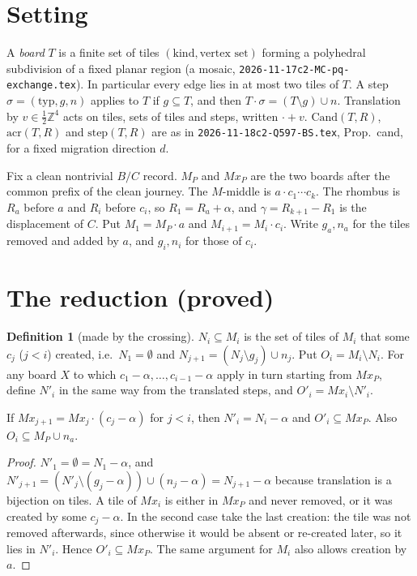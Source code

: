 \documentclass[11pt]{article}
\theoremstyle{definition}\newtheorem{definition}[theorem]{Definition}\newtheorem{remark}[theorem]{Remark}
\begin{document}
\section{Setting}\label{sec:set}
A \emph{board} $T$ is a finite set of tiles $(\mathrm{kind},\text{vertex set})$ forming a polyhedral subdivision of a fixed planar region (a mosaic, \texttt{2026-11-17c2-MC-pq-exchange.tex}). In particular every edge lies in at most two tiles of $T$.
A step $\sigma=(\mathrm{typ},g,n)$ applies to $T$ if $g\subseteq T$, and then $T\cdot\sigma=(T\setminus g)\cup n$. Translation by $v\in\tfrac12\mathbb Z^4$ acts on tiles, sets of tiles and steps, written $\cdot+v$.
$\mathrm{Cand}(T,R)$, $\mathrm{acr}(T,R)$ and $\mathrm{step}(T,R)$ are as in \texttt{2026-11-18c2-Q597-BS.tex}, Prop.~cand, for a fixed migration direction $d$.

Fix a clean nontrivial $B/C$ record. $M_P$ and $Mx_P$ are the two boards after the common prefix of the clean journey. The $M$-middle is $a\cdot c_1\cdots c_k$. The rhombus is $R_a$ before $a$ and $R_i$ before $c_i$, so $R_1=R_a+\alpha$, and $\gamma=R_{k+1}-R_1$ is the displacement of $C$.
Put $M_1=M_P\cdot a$ and $M_{i+1}=M_i\cdot c_i$. Write $g_a,n_a$ for the tiles removed and added by $a$, and $g_i,n_i$ for those of $c_i$.

\section{The reduction (proved)}\label{sec:red}
\begin{definition}[made by the crossing]
$N_i\subseteq M_i$ is the set of tiles of $M_i$ that some $c_j$ ($j<i$) created, i.e.\ $N_1=\emptyset$ and $N_{j+1}=(N_j\setminus g_j)\cup n_j$. Put $O_i=M_i\setminus N_i$. For any board $X$ to which $c_1-\alpha,\dots,c_{i-1}-\alpha$ apply in turn starting from $Mx_P$, define $N'_i$ in the same way from the translated steps, and $O'_i=Mx_i\setminus N'_i$.
\end{definition}

\begin{lemma}\label{lem:hist}
If $Mx_{j+1}=Mx_j\cdot(c_j-\alpha)$ for $j<i$, then $N'_i=N_i-\alpha$ and $O'_i\subseteq Mx_P$. Also $O_i\subseteq M_P\cup n_a$.
\end{lemma}
\begin{proof}
$N'_1=\emptyset=N_1-\alpha$, and $N'_{j+1}=(N'_j\setminus(g_j-\alpha))\cup(n_j-\alpha)=N_{j+1}-\alpha$ because translation is a bijection on tiles.
A tile of $Mx_i$ is either in $Mx_P$ and never removed, or it was created by some $c_j-\alpha$. In the second case take the last creation: the tile was not removed afterwards, since otherwise it would be absent or re-created later, so it lies in $N'_i$. Hence $O'_i\subseteq Mx_P$. The same argument for $M_i$ also allows creation by $a$.
\end{proof}
\end{document}
